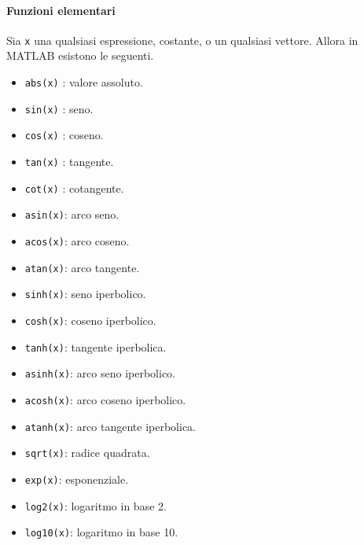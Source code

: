 \paragraph{Funzioni elementari}
Sia \texttt{x} una qualsiasi espressione, costante, o un qualsiasi vettore. Allora in MATLAB esistono le seguenti.
\begin{itemize}	
	
	\item	\texttt{abs(x)} : valore assoluto.
	
	\item	\texttt{sin(x)} : seno.
	
	\item	\texttt{cos(x)} : coseno.
	
	\item	\texttt{tan(x)} : tangente.
	
	\item	\texttt{cot(x)} : cotangente.
	
	\item	\texttt{asin(x)}: arco seno.
	
	\item	\texttt{acos(x)}: arco coseno.
	
	\item	\texttt{atan(x)}: arco tangente.
	
	\item	\texttt{sinh(x)}: seno iperbolico.
	
	\item	\texttt{cosh(x)}: coseno iperbolico.
	
	\item	\texttt{tanh(x)}: tangente iperbolica.
	
	\item	\texttt{asinh(x)}: arco seno iperbolico.
	
	\item	\texttt{acosh(x)}: arco coseno iperbolico.
	
	\item	\texttt{atanh(x)}: arco tangente iperbolica.
	
	\item	\texttt{sqrt(x)}: radice quadrata.
	
	\item	\texttt{exp(x)}: esponenziale.
	
	\item	\texttt{log2(x)}: logaritmo in base 2.

	\item	\texttt{log10(x)}: logaritmo in base 10.
	

\end{itemize}
